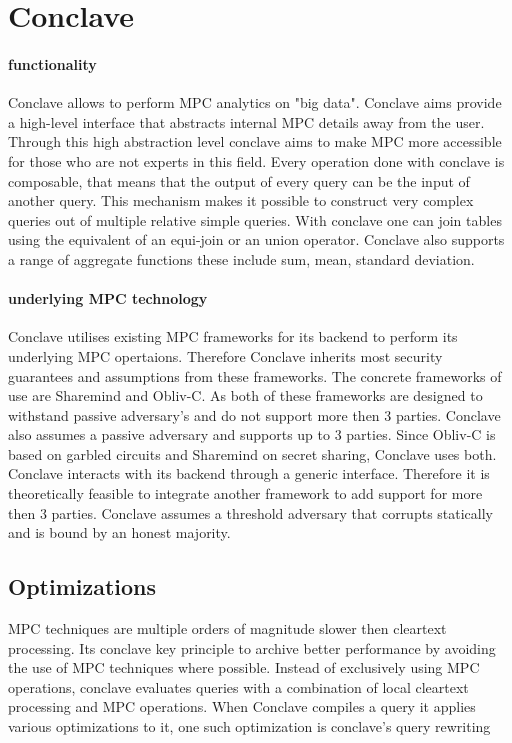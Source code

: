 \section{Conclave}


\paragraph {functionality}
Conclave \cite{10.1145/3302424.3303982} allows to perform MPC analytics on "big data". Conclave aims provide a high-level interface that abstracts internal MPC details away from the user. Through this high abstraction level conclave aims to make MPC more accessible for those who are not experts in this field.  Every operation done with conclave is composable, that means that the output of every query can be the input of another query. This mechanism makes it possible to construct very complex queries out of multiple relative simple queries.  With conclave one can join tables using the equivalent of an equi-join or an union operator. Conclave also supports a range of aggregate functions these include sum, mean, standard deviation. 

\paragraph{underlying MPC technology}
Conclave utilises existing MPC frameworks for its backend to perform its underlying MPC opertaions. Therefore Conclave inherits most security guarantees and assumptions from these frameworks. The concrete frameworks of use are Sharemind and Obliv-C. As both of these frameworks are designed to withstand passive adversary's and do not support more then 3 parties. Conclave also assumes a passive adversary and supports up to 3 parties.
Since Obliv-C is based on garbled circuits and Sharemind on secret sharing, Conclave uses both. Conclave interacts with its backend through a generic interface. Therefore it is theoretically feasible to integrate another framework to add support for more then 3 parties. Conclave assumes a threshold adversary that corrupts statically and is bound by an honest majority.

\subsection{Optimizations}
MPC techniques are multiple orders of magnitude slower then cleartext processing. Its conclave key principle to archive better performance by avoiding the use of MPC techniques where possible. Instead of exclusively using MPC operations, conclave evaluates queries with a combination of local cleartext processing and MPC operations. When Conclave compiles a query it applies various optimizations to it, one such optimization is conclave's query rewriting 
